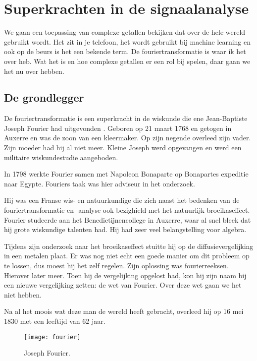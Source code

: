 \documentclass[11pt,fleqn]{book} %
\begin{document}


\chapter{Superkrachten in de signaalanalyse}\label{ch:four}

We gaan een toepassing van complexe getallen bekijken dat over de hele wereld gebruikt wordt. Het zit in je telefoon, het wordt gebruikt bij machine learning en ook op de beurs is het een bekende term. De fouriertransformatie is waar ik het over heb. Wat het is en hoe complexe getallen er een rol bij spelen, daar gaan we het nu over hebben.

\section{De grondlegger}

De fouriertransformatie is een superkracht in de wiskunde die ene Jean-Baptiste Joseph Fourier had uitgevonden \cite{jf}. Geboren op 21 maart 1768 en getogen in Auxerre en was de zoon van een kleermaker. Op zijn negende overleed zijn vader. Zijn moeder had hij al niet meer. Kleine Joseph werd opgevangen en werd een militaire wiskundestudie aangeboden.

In 1798 werkte Fourier samen met Napoleon Bonaparte op Bonapartes expeditie naar Egypte. Fouriers taak was hier adviseur in het onderzoek.

Hij was een Franse wis- en natuurkundige die zich naast het bedenken van de fouriertransformatie en -analyse ook bezighield met het natuurlijk broeikaseffect. Fourier studeerde aan het Benedictijnencollege in Auxerre, waar al snel bleek dat hij grote wiskundige talenten had. Hij had zeer veel belangstelling voor algebra.

Tijdens zijn onderzoek naar het broeikaseffect stuitte hij op de diffusievergelijking in een metalen plaat. Er was nog niet echt een goede manier om dit probleem op te lossen, dus moest hij het zelf regelen. Zijn oplossing was fourierreeksen. Hierover later meer. Toen hij de vergelijking opgelost had, kon hij zijn naam bij een nieuwe vergelijking zetten: de wet van Fourier. Over deze wet gaan we het niet hebben.

Na al het moois wat deze man de wereld heeft gebracht, overleed hij op 16 mei 1830 met een leeftijd van 62 jaar.
\begin{figure}[h]
	\centering\texttt{[image: fourier]}
	\caption{Joseph Fourier.}
	\label{fig:fourier}
\end{figure}
\end{document}
